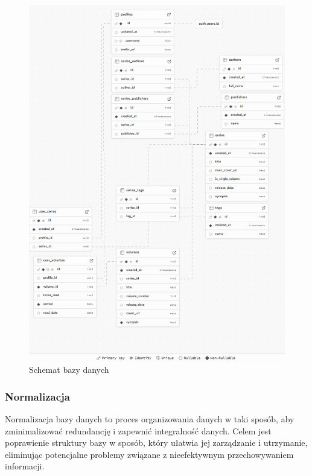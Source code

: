 \documentclass[12pt,twoside]{article}
\begin{document}
\begin{figure}[ht]
	\centering
	\includegraphics[width=1\textwidth]{figures/schemat1.png}
	\caption{Schemat bazy danych}
\label{Fig:schemat}
\end{figure}

\clearpage

\subsubsection{Normalizacja}

Normalizacja bazy danych to proces organizowania danych w taki sposób, aby zminimalizować redundancję i zapewnić 
integralność danych. Celem jest poprawienie struktury bazy w sposób, który ułatwia jej zarządzanie i utrzymanie, 
eliminując potencjalne problemy związane z nieefektywnym przechowywaniem informacji.
\end{document}
